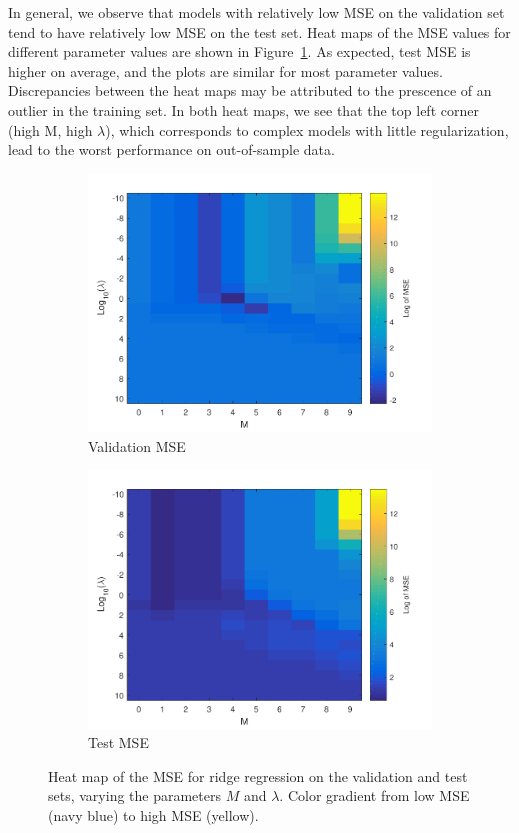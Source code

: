 In general, we observe that models with relatively low MSE on the validation set tend to have relatively low MSE on the test set.  Heat maps of the MSE values for different parameter values are shown in Figure~\ref{fig:heat_map}.   As expected, test MSE is higher on average, and the plots are similar for most parameter values.  Discrepancies between the heat maps may be attributed to the prescence of an outlier in the training set.  In both heat maps, we see that the top left corner (high M, high $\lambda$), which corresponds to complex models with little regularization, lead to the worst performance on out-of-sample data.  

\begin{figure}[h!]
\centering
    \begin{subfigure}[b]{0.4\textwidth}
	\includegraphics[scale=0.55]{hw1_3_2.pdf}
	\caption{Validation MSE}
    \end{subfigure}
    \quad
    \begin{subfigure}[b]{0.4\textwidth}
	\includegraphics[scale=0.55]{hw1_3_2b.pdf}
	\caption{Test MSE}
    \end{subfigure}
\caption{Heat map of the MSE for ridge regression on the validation and test sets, varying the parameters $M$ and $\lambda$.  Color gradient from low MSE (navy blue) to high MSE (yellow).} \label{fig:heat_map}
\end{figure}